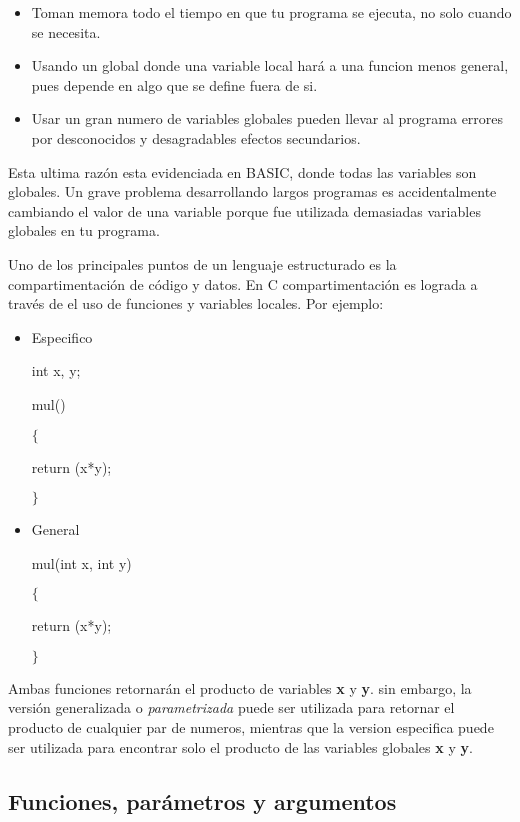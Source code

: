 \documentclass[]{article}
\begin{document}
	\begin{itemize}
		\item Toman memora todo el tiempo en que tu programa se ejecuta, no solo cuando se necesita.
		\item Usando un global donde una variable local hará a una funcion menos general, pues depende en algo que se define fuera de si.
		\item Usar un gran numero de variables globales pueden llevar al programa errores por desconocidos y desagradables efectos secundarios.
	\end{itemize}
	
	Esta ultima razón esta evidenciada en BASIC, donde todas las variables son globales. Un grave problema desarrollando largos programas es accidentalmente cambiando el valor de una variable porque fue utilizada demasiadas variables globales en tu programa.
	
	Uno de los principales puntos de un lenguaje estructurado es la compartimentación de código y datos. En C compartimentación es lograda a través de el uso de funciones y variables locales. Por ejemplo:
	
	\begin{multicols}{2}
		\begin{itemize}
			\item Especifico
			
			int x, y;
			
			mul()

			$\lbrace$
			
			return (x*y);
			
			$\rbrace$
			
			\item General
			
			mul(int x, int y)
			
			$\lbrace$
			
			return (x*y);
			
			$\rbrace$
		\end{itemize}
	\end{multicols}
	
	Ambas funciones retornarán el producto de variables \textbf{x} y \textbf{y}. sin embargo, la versión generalizada o \textit{parametrizada} puede ser utilizada para retornar el producto de cualquier par de numeros, mientras que la version especifica puede ser utilizada para encontrar solo el producto de las variables globales \textbf{x} y \textbf{y}.
	
	\subsection{Funciones, parámetros y argumentos}
	
\end{document}
